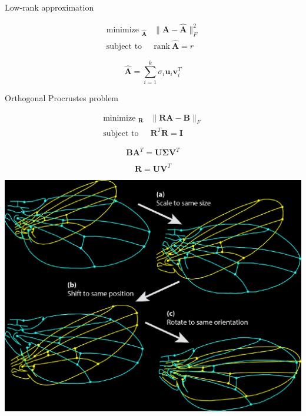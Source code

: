 \documentclass[aspectratio=169]{beamer}
\DeclareMathOperator*{\minimize}{minimize~}
\DeclareMathOperator*{\subto}{subject~to~}
\begin{document}
\begin{frame}{Low-rank approximation}
  \vfill

  \begin{minipage}{.48\textwidth}
    \begin{overprint}
      \Large
      \[
      \begin{aligned}
        \minimize_{\hat{\bm{A}}} & \| \bm{A} - \hat{\bm{A}} \|_F^2 \\
        \subto & \mathrm{rank~} \hat{\bm{A}} = r
      \end{aligned}
      \]
      
      \Large
      \[
      \hat{\bm{A}} = \sum_{i=1}^k \sigma_i \bm{u}_i \bm{v}_i^T
      \]
    \end{overprint}
  \end{minipage}%
  \hfill
  \begin{minipage}{.48\textwidth}
  \end{minipage}

  \vfill
\end{frame}

\begin{frame}{Orthogonal Procrustes problem}
  \vfill
  \begin{minipage}{.48\textwidth}
    \begin{overprint}
      \large
      \[
      \begin{aligned}
        \minimize_{\bm{R}} & \| \bm{RA} - \bm{B} \|_F \\
        \subto & \bm{R}^T \bm{R} = \bm{I}
      \end{aligned}
      \]

      \large
      \[
      \bm{BA}^T = \bm{U} \boldsymbol{\Sigma} \bm{V}^T
      \]

      \large
      \[
      \bm{R} = \bm{UV}^T
      \]

    \end{overprint}
  \end{minipage}%
  \hfill
  \begin{minipage}{.48\textwidth}
    \includegraphics[width=\textwidth]{procrustes}
  \end{minipage}
  \vfill
\end{frame}
\end{document}
